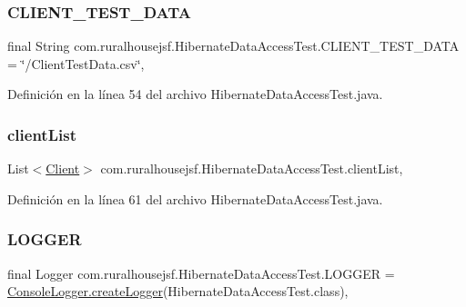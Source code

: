 \subsubsection{\texorpdfstring{CLIENT\_TEST\_DATA}{CLIENT\_TEST\_DATA}}
{\footnotesize\ttfamily final String com.\+ruralhousejsf.\+Hibernate\+Data\+Access\+Test.\+C\+L\+I\+E\+N\+T\+\_\+\+T\+E\+S\+T\+\_\+\+D\+A\+TA = \char`\"{}/Client\+Test\+Data.\+csv\char`\"{}\hspace{0.3cm}{\ttfamily [static]}, {\ttfamily [package]}}



Definición en la línea 54 del archivo Hibernate\+Data\+Access\+Test.\+java.

\mbox{\label{classcom_1_1ruralhousejsf_1_1_hibernate_data_access_test_a9c323e2ca2ed9c802bff65a3a10d88f5}} 
\subsubsection{\texorpdfstring{clientList}{clientList}}
{\footnotesize\ttfamily List$<$\mbox{\hyperlink{classcom_1_1ruralhousejsf_1_1domain_1_1_client}{Client}}$>$ com.\+ruralhousejsf.\+Hibernate\+Data\+Access\+Test.\+client\+List\hspace{0.3cm}{\ttfamily [static]}, {\ttfamily [package]}}



Definición en la línea 61 del archivo Hibernate\+Data\+Access\+Test.\+java.

\mbox{\label{classcom_1_1ruralhousejsf_1_1_hibernate_data_access_test_a9eb49660cab06be45dd2c75727b59ed3}} 
\subsubsection{\texorpdfstring{LOGGER}{LOGGER}}
{\footnotesize\ttfamily final Logger com.\+ruralhousejsf.\+Hibernate\+Data\+Access\+Test.\+L\+O\+G\+G\+ER = \mbox{\hyperlink{classcom_1_1ruralhousejsf_1_1logger_1_1_console_logger_a520321643663e37d95761134a35505cd}{Console\+Logger.\+create\+Logger}}(Hibernate\+Data\+Access\+Test.\+class)\hspace{0.3cm}{\ttfamily [static]}, {\ttfamily [package]}}



